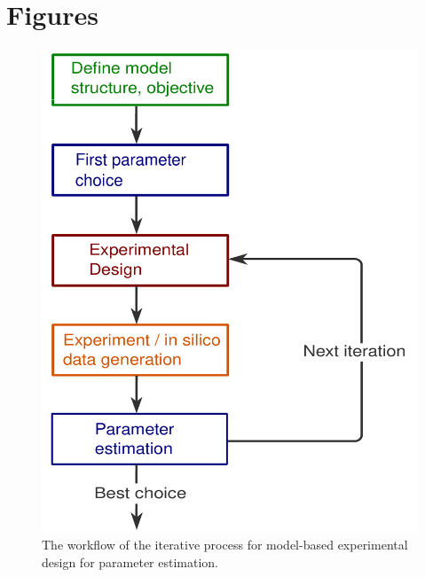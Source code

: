 \documentclass[graybox]{svmult}
\begin{document}
\section*{Figures}
\begin{figure}[H]
    \centering
    \includegraphics[scale=0.3]{Figures/Fig1.pdf}
    \caption{The workflow of the iterative process for model-based experimental design for parameter estimation.}
    \label{Fig1}
\end{figure}
%
%
\end{document}
